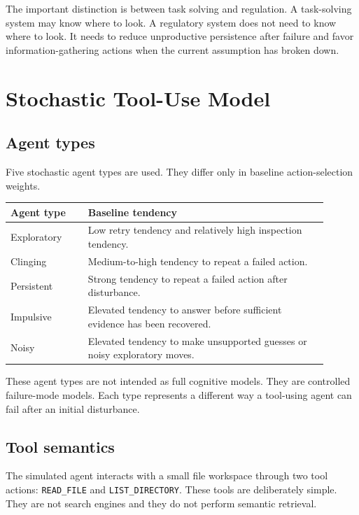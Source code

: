 \documentclass[11pt]{article}
\begin{document}
The important distinction is between task solving and regulation. A task-solving system may know where to look. A regulatory system does not need to know where to look. It needs to reduce unproductive persistence after failure and favor information-gathering actions when the current assumption has broken down.

\section{Stochastic Tool-Use Model}

\subsection{Agent types}

Five stochastic agent types are used. They differ only in baseline action-selection weights.

\begin{center}
\begin{tabular}{p{0.22\linewidth} p{0.68\linewidth}}
\toprule
\textbf{Agent type} & \textbf{Baseline tendency} \\
\midrule
Exploratory & Low retry tendency and relatively high inspection tendency. \\
Clinging & Medium-to-high tendency to repeat a failed action. \\
Persistent & Strong tendency to repeat a failed action after disturbance. \\
Impulsive & Elevated tendency to answer before sufficient evidence has been recovered. \\
Noisy & Elevated tendency to make unsupported guesses or noisy exploratory moves. \\
\bottomrule
\end{tabular}
\end{center}

These agent types are not intended as full cognitive models. They are controlled failure-mode models. Each type represents a different way a tool-using agent can fail after an initial disturbance.

\subsection{Tool semantics}

The simulated agent interacts with a small file workspace through two tool actions: \texttt{READ\_FILE} and \texttt{LIST\_DIRECTORY}. These tools are deliberately simple. They are not search engines and they do not perform semantic retrieval.
\end{document}
